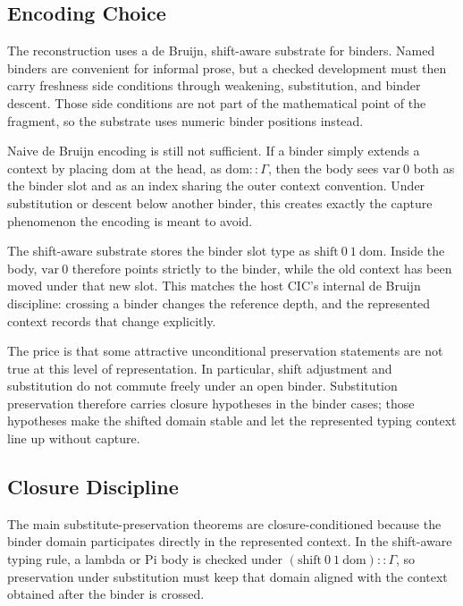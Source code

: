 



\subsection{Encoding Choice}\label{subsec:reconstruction-encoding-choice}

The reconstruction uses a de Bruijn, shift-aware substrate for binders. Named
binders are convenient for informal prose, but a checked development must then
carry freshness side conditions through weakening, substitution, and binder
descent. Those side conditions are not part of the mathematical point of the
fragment, so the substrate uses numeric binder positions instead.

Naive de Bruijn encoding is still not sufficient. If a binder simply extends a
context by placing $\mathrm{dom}$ at the head, as $\mathrm{dom} :: \Gamma$,
then the body sees $\mathrm{var}\ 0$ both as the binder slot and as an index
sharing the outer context convention. Under substitution or descent below
another binder, this creates exactly the capture phenomenon the encoding is
meant to avoid.

The shift-aware substrate stores the binder slot type as
$\mathrm{shift}\ 0\ 1\ \mathrm{dom}$. Inside the body, $\mathrm{var}\ 0$
therefore points strictly to the binder, while the old context has been moved
under that new slot. This matches the host CIC's internal de Bruijn discipline:
crossing a binder changes the reference depth, and the represented context
records that change explicitly.

The price is that some attractive unconditional preservation statements are
not true at this level of representation. In particular, shift adjustment and
substitution do not commute freely under an open binder. Substitution
preservation therefore carries closure hypotheses in the binder cases; those
hypotheses make the shifted domain stable and let the represented typing
context line up without capture.

\subsection{Closure Discipline}\label{subsec:reconstruction-closure-discipline}

The main substitute-preservation theorems are closure-conditioned because the
binder domain participates directly in the represented context. In the
shift-aware typing rule, a lambda or Pi body is checked under
$(\mathrm{shift}\ 0\ 1\ \mathrm{dom}) :: \Gamma$, so preservation under
substitution must keep that domain aligned with the context obtained after the
binder is crossed.


